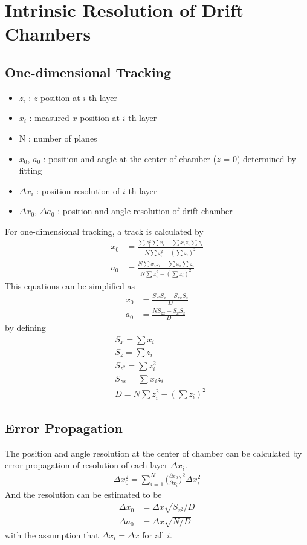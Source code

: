 \chapter{Intrinsic Resolution of Drift Chambers}
\section{One-dimensional Tracking}

\begin{itemize}
    \item $z_i$ : $z$-position at $i$-th layer
    \item $x_i$ : measured $x$-position at $i$-th layer
    \item N : number of planes
    \item $x_0$, $a_0$ : position and angle at the center of chamber ($z$ = 0) determined by fitting
    \item $\Delta x_i$ : position resolution of $i$-th layer
    \item $\Delta x_0$, $\Delta a_0$ : position and angle resolution of drift chamber
\end{itemize}

For one-dimensional tracking, a track is calculated by
\begin{align}
    x_0 &= \frac{\sum z_i^2 \sum x_i - \sum x_iz_i \sum z_i}{N \sum z_i^2 - (\sum z_i)^2} \\ 
    a_0 &= \frac{N \sum x_iz_i - \sum x_i \sum z_i}{N \sum z_i^2 - (\sum z_i)^2}
\end{align}
This equations can be simplified as
\begin{align}
    x_0 &= \frac{S_{z^2} S_x - S_{zx} S_z}{D} \\
    a_0 &= \frac{N S_{zx} - S_x S_z}{D}
\end{align}
by defining
\begin{align}
    &S_x = \sum x_i\\ 
    &S_z = \sum z_i\\
    &S_{z^2} = \sum z_i^2\\
    &S_{zx} = \sum x_iz_i\\ 
    &D = N \sum z_i^2 - (\sum z_i)^2
\end{align}

\section{Error Propagation}
The position and angle resolution at the center of chamber can be calculated by error propagation of resolution of each layer $\Delta x_i$.
\begin{align}
    \Delta x_0^2 = \sum_{i=1}^N \bigg( \frac{\partial x_0}{\partial x_i} \bigg)^2 \Delta x_i^2
    \label{propagarion}
\end{align}
And the resolution can be estimated to be
\begin{align}
    \Delta x_0 &= \Delta x \sqrt{S_{z^2} / D} \\
    \Delta a_0 &= \Delta x \sqrt{N / D}
\end{align}
with the assumption that $\Delta x_i = \Delta x$ for all $i$.

